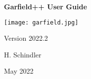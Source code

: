 \begin{titlepage}
  {
  \centering
  \sffamily
  \linespread{1.5}

  \vspace{3cm} 

  \huge{\textbf{Garfield++ User Guide}}

  \vspace{2cm}

  \texttt{[image: garfield.jpg]}

  \vspace{2cm}

  \large
  Version 2022.2

  \vspace{2cm}
  \large
  H. Schindler

  \vfill

  May 2022

  }
\end{titlepage}
